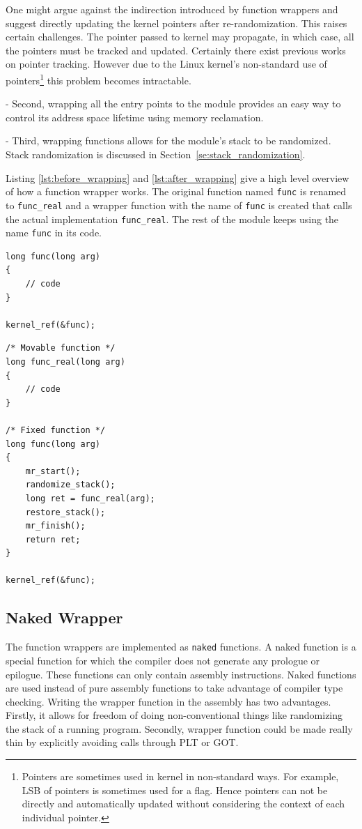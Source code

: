 One might argue against the indirection introduced by function wrappers and suggest directly updating the kernel pointers after re-randomization. This raises certain challenges. The pointer passed to kernel may propagate, in which case, all the pointers must be tracked and updated. Certainly there exist previous works on pointer tracking. However due to the Linux kernel's non-standard use of pointers\footnote{Pointers are sometimes used in kernel in non-standard ways. For example, LSB of pointers is sometimes used for a flag. Hence pointers can not be directly and automatically updated without considering the context of each individual pointer.} \cite{Linux_Pointer_NON_STD} this problem becomes intractable.

- Second, wrapping all the entry points to the module provides an easy way to control its address space lifetime using memory reclamation.

- Third, wrapping functions allows for the module's stack to be randomized. Stack randomization is discussed in Section~\ref{se:stack_randomization}.

Listing \ref{lst:before_wrapping} and \ref{lst:after_wrapping} give a high level overview of how a function wrapper works. The original function named \verb|func| is renamed to \verb|func_real| and a wrapper function with the name of \verb|func| is created that calls the actual implementation \verb|func_real|. The rest of the module keeps using the name \verb|func| in its code.

\lstset{language=C}
\begin{lstlisting}[frame=single, caption={Original Function},label={lst:before_wrapping}]
long func(long arg)
{
    // code
}

kernel_ref(&func);
\end{lstlisting}

\lstset{language=C}
\begin{lstlisting}[frame=single, caption={Wrapped Function},label={lst:after_wrapping}]
/* Movable function */
long func_real(long arg)
{
    // code
}

/* Fixed function */
long func(long arg)
{
    mr_start();
    randomize_stack();
    long ret = func_real(arg);
    restore_stack();
    mr_finish();
    return ret;
}

kernel_ref(&func);
\end{lstlisting}

\subsection{Naked Wrapper}
The function wrappers are implemented as \verb|naked| functions. A naked function is a special function for which the compiler does not generate any prologue or epilogue. These functions can only contain assembly instructions. Naked functions are used instead of pure assembly functions to take advantage of compiler type checking. Writing the wrapper function in the assembly has two advantages. Firstly, it allows for freedom of doing non-conventional things like randomizing the stack of a running program. Secondly, wrapper function could be made really thin by explicitly avoiding calls through PLT or GOT.

